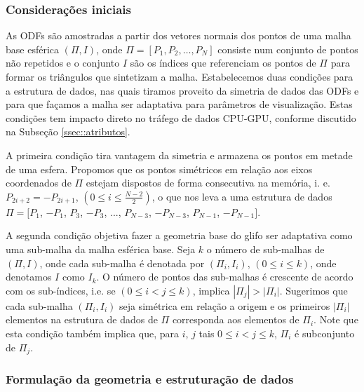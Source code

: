 \subsubsection{Considerações iniciais}

As ODFs são amostradas a partir dos vetores normais dos pontos de uma malha base esférica $(\Pi, I)$, onde $\Pi = [P_1, P_2, \dots, P_N]$ consiste num conjunto de pontos não repetidos e o conjunto $I$ são os índices que referenciam os pontos de $\Pi$ para formar os triângulos que sintetizam a malha. Estabelecemos duas condições para a estrutura de dados, nas quais tiramos proveito da simetria de dados das ODFs e para que façamos a malha ser adaptativa para parâmetros de visualização. Estas condições tem impacto direto no tráfego de dados CPU-GPU, conforme discutido na Subseção \ref{ssec::atributos}.

A primeira condição tira vantagem da simetria e armazena os pontos em metade de uma esfera. Propomos que os pontos simétricos em relação aos eixos coordenados de $\Pi$ estejam dispostos de forma consecutiva na memória, i. e. $P_{2i+2} = -P_{2i+1}$, $(0 \leq i \leq \frac{N-2}{2})$, o que nos leva a uma estrutura de dados $\Pi = [
P_1$,
$-P_1$, 
$P_3$,
$-P_3$, ..., 
$P_{N-3}$,
$-P_{N-3}$, 
$P_{N-1}$,
$-P_{N-1}]$.

A segunda condição objetiva fazer a geometria base do glifo ser adaptativa como uma sub-malha da malha esférica base. Seja $k$ o número de sub-malhas de $(\Pi, I)$, onde cada sub-malha é denotada por $(\Pi_i, I_i)$,  $(0 \leq i \leq k)$, onde denotamos $I$ como $I_k$. O número de pontos das sub-malhas é crescente de acordo com os sub-índices, i.e. se $(0 \leq i < j \leq k)$, implica $|\Pi_j| > |\Pi_i|$. Sugerimos que cada sub-malha $(\Pi_i, I_i)$ seja simétrica em relação a origem e os primeiros $|\Pi_i|$ elementos na estrutura de dados de $\Pi$ corresponda aos elementos de $\Pi_i$. Note que esta condição também implica que, para $i$, $j$ tais $0 \leq i < j \leq k$, $\Pi_i$ é subconjunto de $\Pi_j$.

\subsubsection{Formulação da geometria e estruturação de dados}
\label{sssec::formulação_da_geometria_e_estruturação_de_dados}


